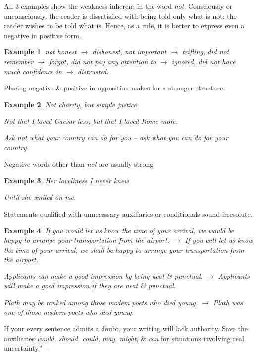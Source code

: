 \documentclass{article}
\newtheorem{example}{Example}
\begin{document}
All 3 examples show the weakness inherent in the word {\it not}. Consciously or unconsciously, the reader is dissatisfied with being told only what is not; the reader wishes to be told what is. Hence, as a rule, it is better to express even a negative in positive form.
\begin{example}
	not honest $\to$ dishonest, not important $\to$ trifling, did not remember $\to$ forgot, did not pay any attention to $\to$ ignored, did not have much confidence in $\to$ distrusted.
\end{example}
Placing negative \& positive in opposition makes for a stronger structure.
\begin{example}
	Not charity, but simple justice.
	
	Not that I loved Caesar less, but that I loved Rome more.
	
	Ask not what your country can do for you -- ask what you can do for your country.
\end{example}
Negative words other than {\it not} are usually strong.
\begin{example}
	Her loveliness I never knew
	
	Until she smiled on me.
\end{example}
Statements qualified with unnecessary auxiliaries or conditionals sound irresolute.
\begin{example}
	If you would let us know the time of your arrival, we would be happy to arrange your transportation from the airport. $\to$ If you will let us know the time of your arrival, we shall be happy to arrange your transportation from the airport.
	
	Applicants can make a good impression by being neat \& punctual. $\to$  Applicants will make a good impression if they are neat \& punctual.
	
	Plath may be ranked among those modem poets who died young. $\to$ Plath was one of those modern poets who died young.
\end{example}
If your every sentence admits a doubt, your writing will lack authority. Save the auxiliaries {\it would, should, could, may, might}, \& {\it can} for situations involving real uncertainty.'' -- \cite[pp. 33--34]{Strunk_White_element_style}

\end{document}

